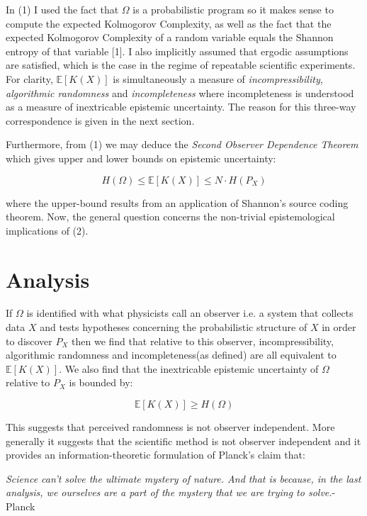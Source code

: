 \documentclass{article}
\begin{document}
In (1) I used the fact that $\Omega$ is a probabilistic program so it makes sense to compute the expected Kolmogorov Complexity, as well as the fact that the expected Kolmogorov Complexity of a random variable equals the Shannon entropy of that variable [1]. I also implicitly assumed that ergodic assumptions are satisfied, which is the case in the regime of repeatable scientific experiments. For clarity, $\mathbb{E}[K(X)]$ is simultaneously a measure of \textit{incompressibility}, \textit{algorithmic randomness} and \textit{incompleteness} where incompleteness is understood as a measure of inextricable epistemic uncertainty. The reason for this three-way correspondence is given in the next section.

Furthermore, from (1) we may deduce the \textit{Second Observer Dependence Theorem} which gives upper and lower bounds on epistemic uncertainty:

\begin{equation}
H(\Omega) \leq \mathbb{E}[K(X)] \leq N \cdot H(P_X) \tag{2}
\end{equation}

where the upper-bound results from an application of Shannon's source coding theorem. Now, the general question concerns the
non-trivial epistemological implications of (2).

\newpage 

\section{Analysis}

If $\Omega$ is identified with what physicists call an observer i.e. a system that collects data $X$ and tests hypotheses concerning the probabilistic structure of $X$ in order to discover $P_X$ then we find that relative to this observer, incompressibility, algorithmic randomness and incompleteness(as defined) are all equivalent to $\mathbb{E}[K(X)]$. We also find that the inextricable epistemic uncertainty of $\Omega$ relative to $P_X$ is bounded by:

\begin{equation}
\mathbb{E}[K(X)] \geq H(\Omega)
\end{equation}

This suggests that perceived randomness is not observer independent. More generally it suggests that the scientific method is not observer independent and it provides an information-theoretic formulation of Planck's claim that:

\textit{Science can’t solve the ultimate mystery of nature. And that is
because, in the last analysis, we ourselves are a part of the mystery
that we are trying to solve.}-Planck
\end{document}
